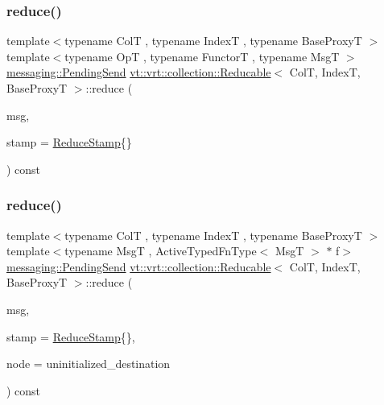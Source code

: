 \subsubsection{\texorpdfstring{reduce()}{reduce()}\hspace{0.1cm}{\footnotesize\ttfamily [6/8]}}
{\footnotesize\ttfamily template$<$typename ColT , typename IndexT , typename Base\+ProxyT $>$ \\
template$<$typename OpT , typename FunctorT , typename MsgT $>$ \\
\hyperlink{structvt_1_1messaging_1_1_pending_send}{messaging\+::\+Pending\+Send} \hyperlink{structvt_1_1vrt_1_1collection_1_1_reducable}{vt\+::vrt\+::collection\+::\+Reducable}$<$ ColT, IndexT, Base\+ProxyT $>$\+::reduce (\begin{DoxyParamCaption}\item[{MsgT $\ast$const}]{msg,  }\item[{\hyperlink{structvt_1_1vrt_1_1collection_1_1_reducable_a19f80baf23f36dad4948ef07322fd0cb}{Reduce\+Stamp}}]{stamp = {\ttfamily \hyperlink{structvt_1_1vrt_1_1collection_1_1_reducable_a19f80baf23f36dad4948ef07322fd0cb}{Reduce\+Stamp}\{\}} }\end{DoxyParamCaption}) const\hspace{0.3cm}{\ttfamily [inline]}}

\mbox{\label{structvt_1_1vrt_1_1collection_1_1_reducable_adec41c02a8c43b709884107d96b729e4}} 
\subsubsection{\texorpdfstring{reduce()}{reduce()}\hspace{0.1cm}{\footnotesize\ttfamily [7/8]}}
{\footnotesize\ttfamily template$<$typename ColT , typename IndexT , typename Base\+ProxyT $>$ \\
template$<$typename MsgT , Active\+Typed\+Fn\+Type$<$ Msg\+T $>$ $\ast$ f$>$ \\
\hyperlink{structvt_1_1messaging_1_1_pending_send}{messaging\+::\+Pending\+Send} \hyperlink{structvt_1_1vrt_1_1collection_1_1_reducable}{vt\+::vrt\+::collection\+::\+Reducable}$<$ ColT, IndexT, Base\+ProxyT $>$\+::reduce (\begin{DoxyParamCaption}\item[{MsgT $\ast$const}]{msg,  }\item[{\hyperlink{structvt_1_1vrt_1_1collection_1_1_reducable_a19f80baf23f36dad4948ef07322fd0cb}{Reduce\+Stamp}}]{stamp = {\ttfamily \hyperlink{structvt_1_1vrt_1_1collection_1_1_reducable_a19f80baf23f36dad4948ef07322fd0cb}{Reduce\+Stamp}\{\}},  }\item[{\hyperlink{namespacevt_a866da9d0efc19c0a1ce79e9e492f47e2}{Node\+Type} const \&}]{node = {\ttfamily uninitialized\+\_\+destination} }\end{DoxyParamCaption}) const}

